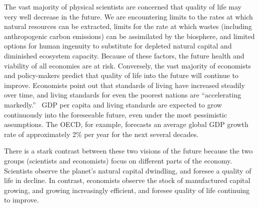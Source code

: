 

The vast majority of physical scientists are concerned that 
quality of life may very well decrease in the future. 
We are encountering 
limits to the rates at which natural resources can be extracted, 
limits for the rate at which wastes (including anthropogenic carbon emissions) 
can be assimilated by the biosphere, and
limited options for human ingenuity to substitute 
for depleted natural capital and diminished ecosystem capacity. 
Because of these factors, 
the future health and viability of all economies are at risk.\cite{IPCC2013} 
Conversely, the vast majority of economists and policy-makers predict 
that quality of life into the future will continue to improve. 
Economists point out that standards of living have increased steadily over time,
and living standards for even the poorest nations 
are ``accelerating markedly.''~\cite{Malik:2013aa} 
GDP per capita and living standards are expected to
grow continuously into the foreseeable future,
even under the most pessimistic assumptions.\cite[p.~170]{Malik:2013aa} 
The OECD, for example, forecasts an average global GDP
growth rate of approximately 2\% per year 
for the next several decades.\cite[Table A.1]{OECD2012}

There is a stark contrast between these two visions of the future 
because the two groups (scientists and economists) focus on 
different parts of the economy.
Scientists observe the planet's natural capital dwindling, 
and foresee a quality of life in decline.
In contrast, economists observe the stock of manufactured capital growing, 
and growing increasingly efficient, 
and foresee quality of life continuing to improve. 

